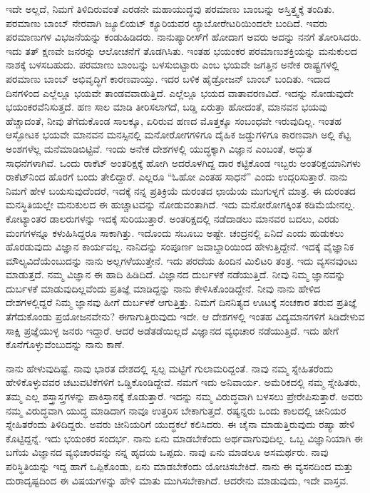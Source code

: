 ಇದೇ ಅಲ್ಲದೆ, ನಿಮಗೆ ತಿಳಿದಿರುವಂತೆ ಎರಡನೇ ಮಹಾಯುದ್ಧವು ಪರಮಾಣು ಬಾಂಬನ್ನು ಅಸ್ತಿತ್ತ್ವಕ್ಕೆ ತಂದಿತು. ಪರಮಾಣು ಬಾಂಬ್ ನೇರವಾಗಿ ಜ್ಯೂಲಿಯಟ್ ಕ್ಯೂರಿಯವರ ಲ್ಯಾಬೋರೇಟರಿ\-ಯಿಂದಲೇ ಬಂದಿದೆ. ಇವರು ಪರಮಾಣುಗಳ ವಿಭಜನೆಯನ್ನು ಕಂಡುಹಿಡಿದರು. ನಾನು\break ಪ್ಯಾರೀಸ್‍ಗೆ ಹೋದಾಗ ಅವರು ಅದನ್ನು ನನಗೆ ತೋರಿಸಿದರು. ಇದು ತತ್ ಕ್ಷಣವೇ ಜನರನ್ನು ಆಲೋಚನೆಗೆ ತೊಡಗಿಸಿತು. ಇಂತಹ ಭಯಂಕರ ಪರಮಾಣುಶಕ್ತಿಯನ್ನು ಮನುಕುಲದ ನಾಶಕ್ಕೆ ಬಳಸಬಹುದು. ಪರಮಾಣು ಬಾಂಬನ್ನು ಬಳಸುಬಿಟ್ಟಾರು ಎಂಬ ಭಯವೇ ಜಗತ್ತಿನ ಅನೇಕ ರಾಷ್ಟ್ರಗಳಲ್ಲಿ ಪರಮಾಣು ಬಾಂಬ್ ಅಭಿವೃದ್ಧಿಗೆ ಕಾರಣವಾಯ್ತು. ಇದರ ಬಳಿಕ ಹೈಡ್ರೋಜನ್ ಬಾಂಬ್ ಬಂದಿತು. ಇದಾದ ದಿನಗಳಿಂದ ಎಲ್ಲೆಲ್ಲೂ ಭಯವೇ ತಾಂಡವವಾಡುತ್ತಿದೆ. ಎಲ್ಲೆಲ್ಲೂ ಭಯದ ವಾತಾವರಣವಿದೆ. ಇದನ್ನು ನೋಡುವುದೇ ಭಯಂಕರವೆನಿಸುತ್ತದೆ. ಹಣ ಸಾಲ ಮಾಡಿ ತೀರಿಸಲಾಗದೆ, ಬಡ್ಡಿ ಏರುತ್ತಾ ಹೋದಂತೆ, ಮಾನವನ ಭಯವು ಹೆಚ್ಚಾದಂತೆ, ನೀವು ತೆಗೆದುಕೊಂಡ ಸಾಲಕ್ಕೂ, ಏರಿರುವ ಹಣದ ಮೊತ್ತಕ್ಕೂ ಸಂಬಂಧವೇ ಇರುವುದಿಲ್ಲ. ಇಂತಹ ಆಸ್ಫೋಟಕ ಭಯವೇ ಮಾನವನ ಮನಸ್ಸಿನಲ್ಲಿ ಮನೋರೋಗಗಳಿಗೂ ದೈಹಿಕ ಜಡ್ಡುಗಳಿಗೂ ಕಾರಣವಾಗಿ ಅಲ್ಲಿ ಕೆಟ್ಟ ಅಂಶಗಳೆಲ್ಲ ಮನೆಮಾಡಿಬಿಟ್ಟಿವೆ. ಇಂದು ಅನೇಕ ದೇಶಗಳಲ್ಲಿ ಯುದ್ಧಕ್ಕಾಗಿ ವಿಜ್ಞಾನ ಎಂಬಂತೆ, ಅದ್ಭುತ ಸಾಧನೆಗಳಾಗಿವೆ. ಒಂದು ರಾಕೆಟ್ ಅಂತರಿಕ್ಷಕ್ಕೆ ಹೋಗಿ ಅದರೊಳಗಿದ್ದ ದಾರ ಕಟ್ಟಿಕೊಂಡ ಇಬ್ಬರು ಅಂತರಿಕ್ಷಯಾನಿಗಳು ರಾಕೆಟ್‍ನಿಂದ ಹೊರಗೆ ಬಂದು ತೇಲಿದ್ದಾರೆ. ಎಲ್ಲರೂ “ಓಹೋ ಎಂತಹ ಸಾಧನೆ” ಎಂದು ಉದ್ಗರಿಸುತ್ತಾರೆ. ನಾನು ನಿಮಗೆ ಹೇಳ ಬಯಸುವುದೆಂದರೆ, ಇದಕ್ಕೆ ನನ್ನ ಪ್ರತಿಕ್ರಿಯೆ ದುರಂತದ ಛಾಯೆಯ ಮುಗುಳ್ನಗೆ ಮಾತ್ರ. ಈ ದುರಂತದ ಮನಸ್ಥಿತಿಯಲ್ಲೇ ಮನುಕುಲದ ಈ ಹುಚ್ಚಾಟವನ್ನು ನೋಡುವಂತಾಗಿದೆ. ಇದು ಮನೋರೋಗಕ್ಕಿಂತ ಕಡಿಮೆಯೇನಲ್ಲ. ಕೋಟ್ಯಾಂತರ ಡಾಲರುಗಳನ್ನು ಇದಕ್ಕೆ ಸುರಿಯುತ್ತಾರೆ. ಅಂತರಿಕ್ಷದಲ್ಲಿ ನಡೆದಾಡಲು ಮಾನವರ ಬದಲು, ಎರಡು ಮಂಗಗಳನ್ನೂ ಕಳುಹಿಸಿದ್ದರೂ ಸಾಕಾಗಿತ್ತು. ಇದೊಂದು ಸಬೂಬು ಅಷ್ಟೇ. ಚಂದ್ರನಲ್ಲಿ ಏನಿದೆ ಎಂದು ಹುಡುಕಲು ಹೊರಡುವುದು ವಿಜ್ಞಾನ ಕಾರ್ಯವಲ್ಲ. ನಾನಿದನ್ನು ಸಂಪೂರ್ಣ ಜವಾಬ್ದಾರಿಯಿಂದ ಹೇಳುತ್ತಿದ್ದೇನೆ. ಇದಕ್ಕೆ ವೈಜ್ಞಾನಿಕ ಮೌಲ್ಯವಿದೆಯೆಂಬುದನ್ನು ನಾನು ಅಲ್ಲಗಳೆಯುತ್ತೇನೆ. ಇದು ಪರದೆಯ ಹಿಂದಿನ ಮಿಲಿಟರಿ ತಂತ್ರ. ಇದು ವ್ಯಸನವುಂಟು ಮಾಡುತ್ತದೆ. ನಮ್ಮ ವಿಜ್ಞಾನ ಈ ಹಾದಿ ಹಿಡಿದಿದೆ. ವಿಜ್ಞಾನದ ದುರ್ಬಳಕೆ ನಡೆಯುತ್ತಿದೆ. ನೀವು ನಿಮ್ಮ ಜ್ಞಾನವನ್ನು ದುರ್ಬಳಕೆ ಮಾಡುವುದಿಲ್ಲವೆಂದು ಪ್ರತಿಜ್ಞೆ ಮಾಡಿದ್ದನ್ನು ನಾನು ಕೇಳಿಸಿಕೊಂಡಿದ್ದೇನೆ. ನೀವು ನಾನು ಹೇಳಿದ ದೇಶಗಳಲ್ಲಿದ್ದರೆ ನಿಮ್ಮ ಜ್ಞಾನವು ಹೀಗೆ ದುರ್ಬಳಕೆ ಆಗುತ್ತಿತ್ತು. ನಿಮಗೆ ದಿನನಿತ್ಯದ ಊಟಕ್ಕೆ ಸಂಚಕಾರ ತರುವ ಪ್ರತಿಜ್ಞೆ ತೆಗೆದುಕೊಂಡು ಪ್ರಯೋಜನವೇನು? ಈಗಾಗುತ್ತಿರುವುದು ಇದೇ. ಆ ದೇಶಗಳಲ್ಲಿ ಇಂತಹ ವಿದ್ಯಮಾನಗಳಿಗೆ ಸಿಡಿದೇಳುವ ಸಾಕ್ಷಿ ಪ್ರಜ್ಞೆಯುಳ್ಳ ಜನರು ಇದ್ದಾರೆ. ಆದರೆ ಅಡೆತಡೆಯಿಲ್ಲದೆ ವಿಜ್ಞಾನದ ವ್ಯಭಿಚಾರ ನಡೆಯುತ್ತಿದೆ. ಇದು ಹೇಗೆ ಕೊನೆಗೊಳ್ಳುವೆಂಬುದನ್ನು ನಾನು ಕಾಣೆ.

ನಾನು ಹೇಳುವುದಿಷ್ಟೆ. ನಾವು ಭಾರತ ದೇಶದಲ್ಲಿ ಸ್ವಲ್ಪ ಮಟ್ಟಿಗೆ ಗುಲಾಮರಿದ್ದಂತೆ. ನಾವು ನಮ್ಮ ಸ್ನೇಹಿತರೆಂದು ಹೇಳಿಕೊಳ್ಳುವವರ ಚಟುವಟಿಕೆಗಳಿಗೆ ಒಡ್ಡಿಕೊಂಡಿದ್ದೇವೆ. ನಮಗೆ ಇದು ಅನಿವಾರ್ಯ. ಅಮೆರಿಕದಲ್ಲಿ ನಮ್ಮ ಸ್ನೇಹಿತರು, ತಮ್ಮ ಎಲ್ಲ ಶಸ್ತ್ರಾಸ್ತ್ರಗಳನ್ನು ಪಾಕಿಸ್ತಾನಕ್ಕೆ ಕೊಡುತ್ತಾರೆ. ಇದನ್ನು ನಮ್ಮ ವಿರುದ್ಧವಾಗಿ ಬಳಸಲು ಪ್ರೇರೇಪಿಸುತ್ತಾರೆ. ಅವರು ನಮ್ಮ ವಿರುದ್ಧವಾಗಿ ಯುದ್ಧ ಮಾಡಿದಾಗ ನಾವೂ ಉತ್ತರಿಸ ಬೇಕಾಗುತ್ತದೆ. ರಷ್ಯನ್ನರು ಒಂದು ಕಾಲದಲ್ಲಿ ಚೀನಿಯರ ಸ್ನೇಹಿತರೆಂದು ತಿಳಿದಿದ್ದರು. ಅವರು ಚೀನಿಯರಿಗೆ ಯುದ್ಧಕಲೆ ಕಲಿಸಿದರು. ಈ ಚೈನಾ ಮಾಡುತ್ತಿರುವುದು ರಷ್ಯಾ ಹೇಳಿ ಕೊಟ್ಟಿದ್ದನ್ನೆ. ಇದು ಭಯಂಕರ ಸಂದರ್ಭ. ನಾನು ಏನು ಮಾಡಬೇಕೆಂದು ಅರ್ಥವಾಗುವುದಿಲ್ಲ. ಒಬ್ಬ ವಿಜ್ಞಾನಿಯಾಗಿ ಈ ಬಗೆಯ ವಿಜ್ಞಾನದ ವ್ಯಭಿಚಾರವನ್ನು ನನ್ನ ಹೃದಯ ಒಪ್ಪದು. ನಾವು ಏನು ಮಾಡಲೂ ಅಸಮರ್ಥರು. ನಾವು ಪರಿಸ್ಥಿತಿಯನ್ನು ಇದ್ದ ಹಾಗೆ ಒಪ್ಪಿಕೊಂಡು, ಏನು ಮಾಡಬೇಕೆಂದು ಯೋಚಿಸಬೇಕಿದೆ. ನಾನು ಈ ವ್ಯಸನದಿಂದ ಮತ್ತು ದುರಾದೃಷ್ಟದಿಂದ ಈ ವಿಷಯಗಳನ್ನು ಹೇಳಿ ಮಾತು ಮುಗಿಸಬೇಕಾಗಿದೆ. ಆದರೇನು ಮಾಡುವುದು, ಇದೇ ವಾಸ್ತವ.


